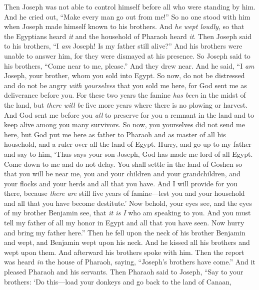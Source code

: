 \begin{biblechapter} %
 Then Joseph was not able to control himself before all who were standing by him. And he cried out, “Make every man go out from me!” So no one stood with him when Joseph made himself known to his brothers.
\verse And \textit{he wept loudly}, so that the Egyptians heard \textit{it} and the household of Pharaoh heard \textit{it}.
\verse Then Joseph said to his brothers, “I \textit{am} Joseph! Is my father still alive?” And his brothers were unable to answer him, for they were dismayed at his presence.
\verse So Joseph said to his brothers, “Come near to me, please.” And they drew near. And he said, “I \textit{am} Joseph, your brother, whom you sold into Egypt.
\verse So now, do not be distressed and do not be angry \textit{with yourselves} that you sold me here, for God sent me as deliverance before you.
\verse For these two years the famine \textit{has been} in the midst of the land, but \textit{there will be} five more years where there is no plowing or harvest.
\verse And God sent me before you \textit{all} to preserve for you a remnant in the land and to keep alive among you many survivors.
\verse So now, you yourselves did not send me here, but God put me here as father to Pharaoh and as master of all his household, and a ruler over all the land of Egypt.
\verse Hurry, and go up to my father and say to him, ‘Thus says your son Joseph, God has made me lord of all Egypt. Come down to me and do not delay.
\verse You shall settle in the land of Goshen so that you will be near me, you and your children and your grandchildren, and your flocks and your herds and all that you have.
\verse And I will provide for you there, because \textit{there are} still five years of famine—lest you and your household and all that you have become destitute.’
\verse Now behold, your eyes see, and the eyes of my brother Benjamin see, that \textit{it is I} who am speaking to you.
\verse And you must tell my father of all my honor in Egypt and all that you have seen. Now hurry and bring my father here.”
\verse Then he fell upon the neck of his brother Benjamin and wept, and Benjamin wept upon his neck.
\verse And he kissed all his brothers and wept upon them. And afterward his brothers spoke with him.
\verse Then the report was heard \textit{in} the house of Pharaoh, saying, “Joseph’s brothers have come.” And it pleased Pharaoh and his servants.
\verse Then Pharaoh said to Joseph, “Say to your brothers: ‘Do this—load your donkeys and go back to the land of Canaan,

\end{biblechapter}
